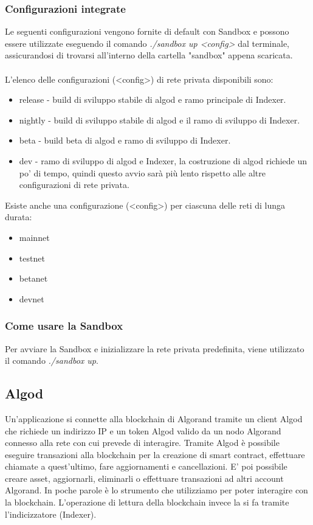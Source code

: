 \subsubsection{Configurazioni integrate}
Le seguenti configurazioni vengono fornite di default con Sandbox e possono essere utilizzate eseguendo il comando \textit{./sandbox up <config>} dal terminale, assicurandosi di trovarsi all'interno della cartella "sandbox" appena scaricata. \\ \\
L'elenco delle configurazioni (<config>) di rete privata disponibili sono:
\begin{itemize}
    \item release - build di sviluppo stabile di algod e ramo principale di Indexer.
    \item nightly - build di sviluppo stabile di algod e il ramo di sviluppo di Indexer.
    \item beta - build beta di algod e ramo di sviluppo di Indexer.
    \item dev - ramo di sviluppo di algod e Indexer, la costruzione di algod richiede un po' di tempo, quindi questo avvio sarà più lento rispetto alle altre configurazioni di rete privata.
\end{itemize}
Esiste anche una configurazione (<config>) per ciascuna delle reti di lunga durata:
\begin{itemize}
    \item mainnet
    \item testnet
    \item betanet
    \item devnet
\end{itemize}

\subsubsection{Come usare la Sandbox}
Per avviare la Sandbox e inizializzare la rete privata predefinita, viene utilizzato il comando \textit{./sandbox up}.

\subsection{Algod}
Un'applicazione si connette alla blockchain di Algorand tramite un client Algod che richiede un indirizzo IP e un token Algod valido da un nodo Algorand connesso alla rete con cui prevede di interagire. Tramite Algod è possibile eseguire transazioni alla blockchain per la creazione di smart contract, effettuare chiamate a quest'ultimo, fare aggiornamenti e cancellazioni. E' poi possibile creare asset, aggiornarli, eliminarli o effettuare transazioni ad altri account Algorand. In poche parole è lo strumento che utilizziamo per poter interagire con la blockchain. L'operazione di lettura della blockchain invece la si fa tramite l'indicizzatore (Indexer).


